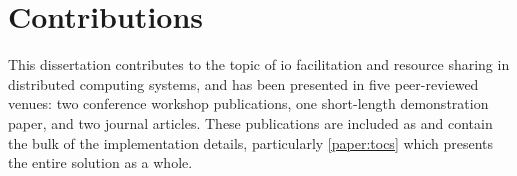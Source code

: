 %









%




\section{Contributions}
This dissertation contributes to the topic of \gls{io} facilitation and resource sharing in distributed computing systems, and has been presented in five peer-reviewed venues: two conference workshop publications, one short-length demonstration paper, and two journal articles.
These publications are included as  and contain the bulk of the implementation details, particularly \cref{paper:tocs} which presents the entire solution as a whole.


